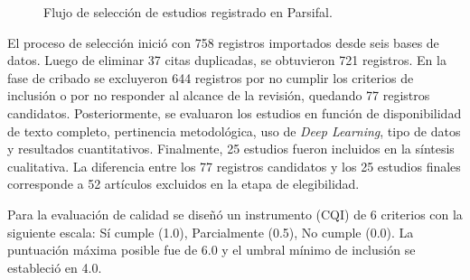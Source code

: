 \documentclass[12pt, a4paper]{article}
\begin{document}
\begin{figure}[H]
{%
}
\caption{Flujo de selecci\'on de estudios registrado en Parsifal.}
\label{fig:seleccion}
\end{figure}

\noindent El proceso de selecci\'{o}n inici\'{o} con 758 registros importados desde seis bases de datos. Luego de eliminar 37 citas duplicadas, se obtuvieron 721 registros. En la fase de cribado se excluyeron 644 registros por no cumplir los criterios de inclusi\'{o}n o por no responder al alcance de la revisi\'{o}n, quedando 77 registros candidatos. Posteriormente, se evaluaron los estudios en funci\'{o}n de disponibilidad de texto completo, pertinencia metodol\'{o}gica, uso de \textit{Deep Learning}, tipo de datos y resultados cuantitativos. Finalmente, 25 estudios fueron incluidos en la s\'{i}ntesis cualitativa. La diferencia entre los 77 registros candidatos y los 25 estudios finales corresponde a 52 art\'{i}culos excluidos en la etapa de elegibilidad.

Para la evaluaci\'{o}n de calidad se dise\~{n}\'{o} un instrumento (CQI) de 6 criterios con la siguiente escala: S\'{i} cumple (1.0), Parcialmente (0.5), No cumple (0.0). La puntuaci\'{o}n m\'{a}xima posible fue de 6.0 y el umbral m\'{i}nimo de inclusi\'{o}n se estableci\'{o} en 4.0.
\end{document}
